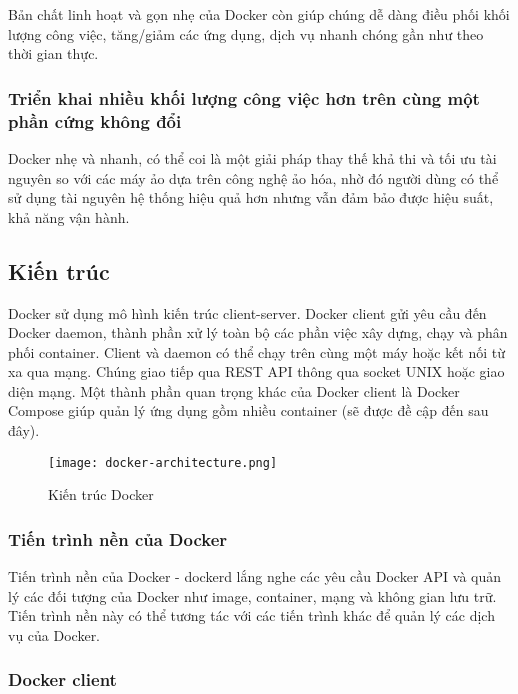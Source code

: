 Bản chất linh hoạt và gọn nhẹ của Docker còn giúp chúng dễ dàng điều phối khối lượng công việc, tăng/giảm các ứng dụng, dịch vụ nhanh chóng gần như theo thời gian thực.

\subsubsection{Triển khai nhiều khối lượng công việc hơn trên cùng một phần cứng không đổi}

Docker nhẹ và nhanh, có thể coi là một giải pháp thay thế khả thi và tối ưu tài nguyên so với các máy ảo dựa trên công nghệ ảo hóa, nhờ đó người dùng có thể sử dụng tài nguyên hệ thống hiệu quả hơn nhưng vẫn đảm bảo được hiệu suất, khả năng vận hành.

\subsection{Kiến trúc}
Docker sử dụng mô hình kiến trúc client-server. Docker client gửi yêu cầu đến Docker daemon, thành phần xử lý toàn bộ các phần việc xây dựng, chạy và phân phối container. Client và daemon có thể chạy trên cùng một máy hoặc kết nối từ xa qua mạng. Chúng giao tiếp qua REST API thông qua socket UNIX hoặc giao diện mạng. Một thành phần quan trọng khác của Docker client là Docker Compose giúp quản lý ứng dụng gồm nhiều container (sẽ được đề cập đến sau đây).

\begin{center}
    \begin{figure}
        \texttt{[image: docker-architecture.png]}
        \caption{Kiến trúc Docker}
    \end{figure}
\end{center}


\subsubsection{Tiến trình nền của Docker}

Tiến trình nền của Docker - dockerd lắng nghe các yêu cầu Docker API và quản lý các đối tượng của Docker như image, container, mạng và không gian lưu trữ. Tiến trình nền này có thể tương tác với các tiến trình khác để quản lý các dịch vụ của Docker.

\subsubsection{Docker client}

